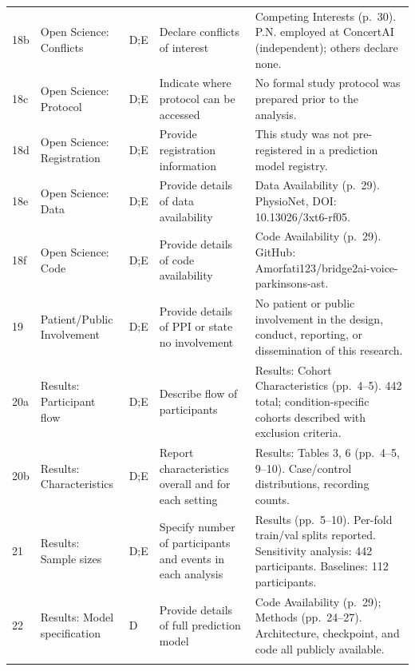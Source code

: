 \documentclass[11pt,a4paper]{article}
\begin{document}
{\begin{longtable}{C{0.6cm} L{2.2cm} C{0.6cm} L{5.5cm} L{4.5cm}}
18b & Open Science: Conflicts & D;E & Declare conflicts of interest & Competing Interests (p.~30). P.N. employed at ConcertAI (independent); others declare none. \\
\addlinespace

18c & Open Science: Protocol & D;E & Indicate where protocol can be accessed & No formal study protocol was prepared prior to the analysis. \\
\addlinespace

18d & Open Science: Registration & D;E & Provide registration information & This study was not pre-registered in a prediction model registry. \\
\addlinespace

18e & Open Science: Data & D;E & Provide details of data availability & Data Availability (p.~29). PhysioNet, DOI: 10.13026/3xt6-rf05. \\
\addlinespace

18f & Open Science: Code & D;E & Provide details of code availability & Code Availability (p.~29). GitHub: Amorfati123/bridge2ai-voice-parkinsons-ast. \\
\addlinespace

19 & Patient/Public Involvement & D;E & Provide details of PPI or state no involvement & No patient or public involvement in the design, conduct, reporting, or dissemination of this research. \\
\addlinespace

20a & Results: Participant flow & D;E & Describe flow of participants & Results: Cohort Characteristics (pp.~4--5). 442 total; condition-specific cohorts described with exclusion criteria. \\
\addlinespace

20b & Results: Characteristics & D;E & Report characteristics overall and for each setting & Results: Tables 3, 6 (pp.~4--5, 9--10). Case/control distributions, recording counts. \\
\addlinespace

21 & Results: Sample sizes & D;E & Specify number of participants and events in each analysis & Results (pp.~5--10). Per-fold train/val splits reported. Sensitivity analysis: 442 participants. Baselines: 112 participants. \\
\addlinespace

22 & Results: Model specification & D & Provide details of full prediction model & Code Availability (p.~29); Methods (pp.~24--27). Architecture, checkpoint, and code all publicly available. \\
\addlinespace


\end{longtable}}
\end{document}
